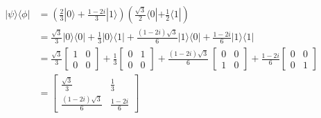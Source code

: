 \begin{align*}
    |\psi\rangle\langle\phi| &= \left(\frac{2}{3}|0\rangle+\frac{1-2i}{3}|1\rangle\right)\left(\frac{\sqrt{3}}{2}\langle0|+\frac{1}{2}\langle1|\right)\\
    &= \frac{\sqrt{3}}{3}|0\rangle\langle0| + \frac{1}{3}|0\rangle\langle1| + \frac{(1-2i)\sqrt{3}}{6}|1\rangle\langle0| + \frac{1-2i}{6}|1\rangle\langle1|\\
    &= \frac{\sqrt{3}}{3} \begin{bmatrix}
        1 & 0 \\
        0 & 0
    \end{bmatrix}
    + \frac{1}{3} \begin{bmatrix}
        0 & 1 \\
        0 & 0
    \end{bmatrix}
    + \frac{(1-2i)\sqrt{3}}{6} \
    \begin{bmatrix}
        0 & 0 \\
        1 & 0
    \end{bmatrix}
    + \frac{1-2i}{6} \begin{bmatrix}
        0 & 0 \\
        0 & 1
    \end{bmatrix}\\
    &= \begin{bmatrix}
        \frac{\sqrt{3}}{3} & \frac{1}{3} \\
        \frac{(1-2i)\sqrt{3}}{6} & \frac{1-2i}{6}
    \end{bmatrix}
\end{align*}

